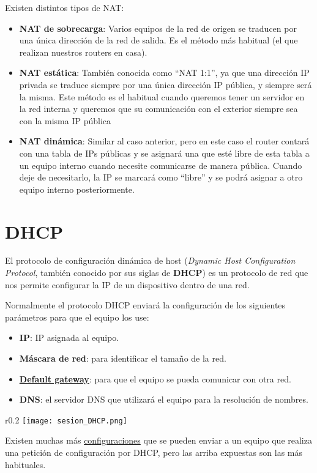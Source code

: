 Existen distintos tipos de NAT:
\begin{itemize}
    \item \textbf{NAT de sobrecarga}: Varios equipos de la red de origen se traducen por una única dirección de la red de salida. Es el método más habitual (el que realizan nuestros routers en casa).

    \item \textbf{NAT estática}: También conocida como “NAT 1:1”, ya que una dirección IP privada se traduce siempre por una única dirección IP pública, y siempre será la misma. Este método es el habitual cuando queremos tener un servidor en la red interna y queremos que su comunicación con el exterior siempre sea con la misma IP pública

    \item \textbf{NAT dinámica}: Similar al caso anterior, pero en este caso el router contará con una tabla de IPs públicas y se asignará una que esté libre de esta tabla a un equipo interno cuando necesite comunicarse de manera pública. Cuando deje de necesitarlo, la IP se marcará como “libre” y se podrá asignar a otro equipo interno posteriormente.
\end{itemize}

\hypertarget{dhcp}{}
\section{DHCP}
El protocolo de configuración dinámica de host (\textit{Dynamic Host Configuration Protocol}, también conocido por sus siglas de \textbf{DHCP}) es un protocolo de red que nos permite configurar la IP de un dispositivo dentro de una red.

Normalmente el protocolo DHCP enviará la configuración de los siguientes parámetros para que el equipo los use:

\begin{itemize}
    \item \textbf{IP}: IP asignada al equipo.
    \item \textbf{Máscara de red}: para identificar el tamaño de la red.
    \item \textbf{\hyperlink{default_gateway}{Default gateway}}: para que el equipo se pueda comunicar con otra red.
    \item \textbf{DNS}: el servidor DNS que utilizará el equipo para la resolución de nombres.
\end{itemize}

\begin{wrapfigure}{r}{0.2\linewidth}
    \centering
    \vspace{-20pt}
    \texttt{[image: sesion\_DHCP.png]}
    \vspace{-32pt}
    \vspace{-30pt}
\end{wrapfigure}
Existen muchas más \href{https://es.wikipedia.org/wiki/Par\%C3\%A1metros_DHCP}{configuraciones} que se pueden enviar a un equipo que realiza una petición de configuración por DHCP, pero las arriba expuestas son las más habituales.

